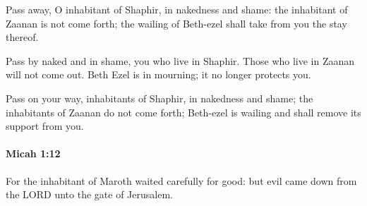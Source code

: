 			\begin{versebox}
					\item[BHS] 
					\item[LXX] 
					\item[ASV] Pass away, O inhabitant of Shaphir, in nakedness and shame: the inhabitant of Zaanan is not come forth; the wailing of Beth-ezel shall take from you the stay thereof.
					\item[NIV] Pass by naked and in shame, you who live in Shaphir. Those who live in Zaanan will not come out. Beth Ezel is in mourning; it no longer protects you.
					\item[NRSV] Pass on your way, inhabitants of Shaphir, in nakedness and shame; the inhabitants of Zaanan do not come forth; Beth-ezel is wailing and shall remove its support from you.
			\end{versebox}

		\paragraph{Micah 1:12} %
			\label{MICAH-1-12}

			For the inhabitant of Maroth waited carefully for good: but evil came down from the LORD unto the gate of Jerusalem.

